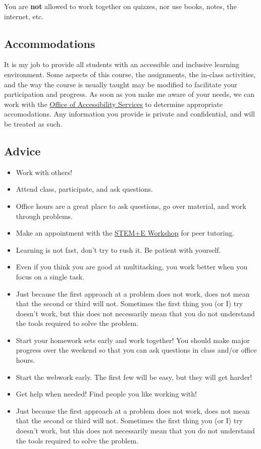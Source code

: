 \documentclass[11pt]{amsart}
\begin{document}
You are \textbf{not} allowed to work together on quizzes, nor use books, notes, the internet, etc.



\subsection*{Accommodations}
It is my job to provide all students with an accessible and inclusive learning environment.
Some aspects of this course, the assignments, the in-class activities, and the way the course is usually taught may be modified to facilitate your participation and progress.
As soon as you make me aware of your needs, we can work with the
\href{https://www.holycross.edu/health-wellness-and-access/office-accessibility-services}{Office of Accessibility Services}
to determine appropriate accomodations.
Any information you provide is private and confidential, and will be treated as such.


\subsection*{Advice}
\begin{itemize}
\item Work with others!
\item Attend class, participate, and ask questions.
\item Office hours are a great place to ask questions, go over material, and work through problems.
\item Make an appointment with the \href{https://www.holycross.edu/support-and-resources/academic-services-and-learning-resources/steme-workshop}{STEM+E Workshop} for peer tutoring.
\item Learning is not fast, don't try to rush it. Be patient with yourself.
\item Even if you think you are good at multitasking, you work better when you focus on a single task.
\item Just because the first approach at a problem does not work, does not mean that the second or third will not. Sometimes the first thing you (or I) try doesn't work, but this does not necessarily mean that you do not understand the tools required to solve the problem.
\item Start your homework sets early and work together! You should make major progress over the weekend so that you can ask questions in class and/or office hours.
\item Start the webwork early. The first few will be easy, but they will get harder!
\item Get help when needed! Find people you like working with!
\item Just because the first approach at a problem does not work, does not mean that the second or third will not. Sometimes the first thing you (or I) try doesn't work, but this does not necessarily mean that you do not understand the tools required to solve the problem.
\end{itemize}
\end{document}

